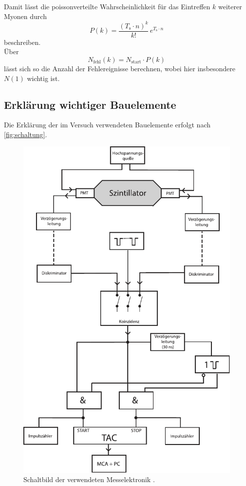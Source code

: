 Damit lässt die poissonverteilte Wahrscheinlichkeit für das Eintreffen $k$ weiterer Myonen durch
\begin{equation*}
    P(k) = \frac{(T_\text{s} \cdot n)^k}{k!} \, e^{T_\text{s} \cdot n}
\end{equation*}
beschreiben. \\

Über
\begin{equation*}
    N_\text{fehl} (k) = N_\text{start} \cdot P(k)
\end{equation*}
lässt sich so die Anzahl der Fehlereignisse berechnen, wobei hier insbesondere $N(1)$ wichtig ist. \\



\newpage

\subsection{Erklärung wichtiger Bauelemente}

Die Erklärung der im Versuch verwendeten Bauelemente erfolgt nach \autoref{fig:schaltung}.

\begin{figure}[H]
    \centering
    \includegraphics[width=.6\textwidth]{figures/V01.pdf}
    \caption{Schaltbild der verwendeten Messelektronik \cite{ap03}.}
    \label{fig:schaltung}
\end{figure}

